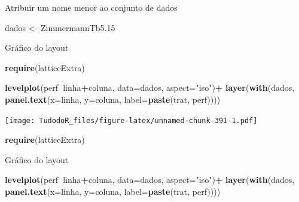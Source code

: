 \documentclass[
]{book}
\newenvironment{Shaded}{\begin{snugshade}}{\end{snugshade}}
\newcommand{\DataTypeTok}[1]{\textcolor[rgb]{0.13,0.29,0.53}{#1}}
\newcommand{\FloatTok}[1]{\textcolor[rgb]{0.00,0.00,0.81}{#1}}
\newcommand{\KeywordTok}[1]{\textcolor[rgb]{0.13,0.29,0.53}{\textbf{#1}}}
\newcommand{\NormalTok}[1]{#1}
\newcommand{\OperatorTok}[1]{\textcolor[rgb]{0.81,0.36,0.00}{\textbf{#1}}}
\newcommand{\StringTok}[1]{\textcolor[rgb]{0.31,0.60,0.02}{#1}}
\begin{document}
Atribuir um nome menor ao conjunto de dados

\begin{Shaded}
\begin{Highlighting}[]
\NormalTok{dados <-}\StringTok{ }\NormalTok{ZimmermannTb5}\FloatTok{.15}
\end{Highlighting}
\end{Shaded}

Gráfico do layout

\begin{Shaded}
\begin{Highlighting}[]
\KeywordTok{require}\NormalTok{(latticeExtra) }

\KeywordTok{levelplot}\NormalTok{(perf}\OperatorTok{~}\NormalTok{linha}\OperatorTok{+}\NormalTok{coluna, }
          \DataTypeTok{data=}\NormalTok{dados, }\DataTypeTok{aspect=}\StringTok{"iso"}\NormalTok{)}\OperatorTok{+}\StringTok{ }
\StringTok{          }\KeywordTok{layer}\NormalTok{(}\KeywordTok{with}\NormalTok{(dados, }
          \KeywordTok{panel.text}\NormalTok{(}\DataTypeTok{x=}\NormalTok{linha, }\DataTypeTok{y=}\NormalTok{coluna, }
          \DataTypeTok{label=}\KeywordTok{paste}\NormalTok{(trat, perf))))}
\end{Highlighting}
\end{Shaded}

\texttt{[image: TudodoR\_files/figure-latex/unnamed-chunk-391-1.pdf]}

\begin{Shaded}
\begin{Highlighting}[]
\KeywordTok{require}\NormalTok{(latticeExtra)}
\end{Highlighting}
\end{Shaded}

Gráfico do layout

\begin{Shaded}
\begin{Highlighting}[]
\KeywordTok{levelplot}\NormalTok{(perf}\OperatorTok{~}\NormalTok{linha}\OperatorTok{+}\NormalTok{coluna, }
          \DataTypeTok{data=}\NormalTok{dados, }\DataTypeTok{aspect=}\StringTok{"iso"}\NormalTok{)}\OperatorTok{+}\StringTok{ }
\StringTok{          }\KeywordTok{layer}\NormalTok{(}\KeywordTok{with}\NormalTok{(dados, }
          \KeywordTok{panel.text}\NormalTok{(}\DataTypeTok{x=}\NormalTok{linha, }\DataTypeTok{y=}\NormalTok{coluna, }
          \DataTypeTok{label=}\KeywordTok{paste}\NormalTok{(trat, perf))))}
\end{Highlighting}
\end{Shaded}
\end{document}
